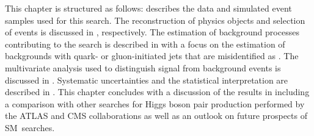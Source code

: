 This chapter is structured as follows:  describes
the data and simulated event samples used for this search. The reconstruction of
physics objects and selection of events is discussed in
, respectively. The
estimation of background processes contributing to the search is described in
 with a focus on the estimation of backgrounds
with quark- or gluon-initiated jets that are misidentified as \tauhadvis. The
multivariate analysis used to distinguish signal from background events is
discussed in . Systematic uncertainties and the
statistical interpretation are described in
. This chapter concludes with a
discussion of the results in  including a comparison
with other searches for Higgs boson pair production performed by the ATLAS and
CMS collaborations as well as an outlook on future prospects of SM~\HH searches.



